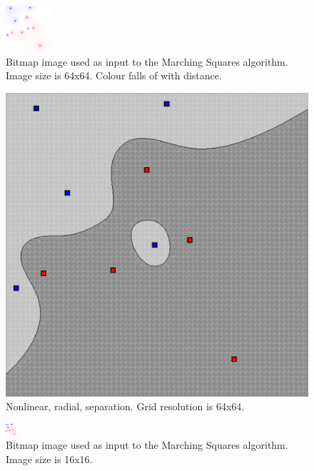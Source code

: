 \documentclass[12pt]{article}
\begin{document}
\begin{figure} 
\centering
  \includegraphics[width = 3 in]{64_res_image.png}
  \caption{Bitmap image used as input to the Marching Squares algorithm. 
Image size is 64x64.
Colour falls of with distance.
}
\end{figure}

\begin{figure} 
\centering
  \includegraphics[width = 3 in]{64_res.png}
  \caption{Nonlinear, radial, separation. Grid resolution is 64x64.
}
\end{figure}


\begin{figure} 
\centering
  \includegraphics[width = 3 in]{16_res_image.png}
  \caption{Bitmap image used as input to the Marching Squares algorithm.
Image size is 16x16.
}
\end{figure}
\end{document}
